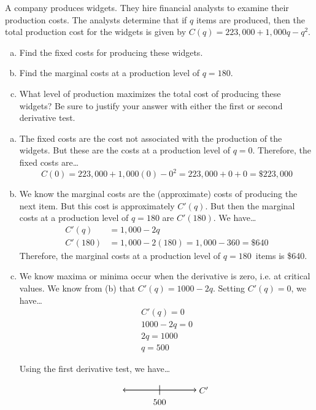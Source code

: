 \documentclass[12pt,letterpaper]{exam}
\begin{document}
\begin{questions}
\newpage
\question[15] A company produces widgets. They hire financial analysts to examine their production costs. The analysts determine that if $q$ items are produced, then the total production cost for the widgets is given by $C(q)= 223,\!000 + 1,\!000q - q^2$. 
	\begin{enumerate}[(a)]
	\item Find the fixed costs for producing these widgets. 
	\item Find the marginal costs at a production level of $q= 180$.
	\item What level of production maximizes the total cost of producing these widgets? Be sure to justify your answer with either the first or second derivative test. 
	\end{enumerate} \pspace

{\itshape \tsol
	\begin{enumerate}[(a)]
	\item The fixed costs are the cost not associated with the production of the widgets. But these are the costs at a production level of $q= 0$. Therefore, the fixed costs are\dots
		\[
		C(0)= 223,\!000 + 1,\!000(0) - 0^2= 223,\!000 + 0 + 0= \$223,\!000
		\] \pspace
	
	\item We know the marginal costs are the (approximate) costs of producing the next item. But this cost is approximately $C'(q)$. But then the marginal costs at a production level of $q= 180$ are $C'(180)$. We have\dots
		\[
		\begin{aligned}
		C'(q)&= 1,\!000 - 2q \\[0.3cm]
		C'(180)&= 1,\!000 - 2(180)= 1,\!000 - 360= \$640 
		\end{aligned}
		\]
	Therefore, the marginal costs at a production level of $q= 180$~items is \$640. \pspace
	
	\item We know maxima or minima occur when the derivative is zero, i.e. at critical values. We know from (b) that $C'(q)= 1000 - 2q$. Setting $C'(q)= 0$, we have\dots
		\[
		\begin{gathered}
		C'(q)= 0 \\[0.3cm]
		1000 - 2q= 0 \\[0.3cm]
		2q= 1000 \\[0.3cm]
		q= 500
		\end{gathered}
		\] \par
	Using the first derivative test, we have\dots \par
		\[
        		\begin{tikzpicture}[scale=1]
        		\draw[line width=0.03cm,<->] (-1.5,0) -- (1.5,0);
        		\draw[line width=0.02cm] (0,-0.2) -- (0,0.2);
        			\node at (1.8,0) {$C'$};
        		\node at (0,-0.5) {$500$};
        	

\end{tikzpicture}\]
\end{enumerate}}
\end{questions}
\end{document}
